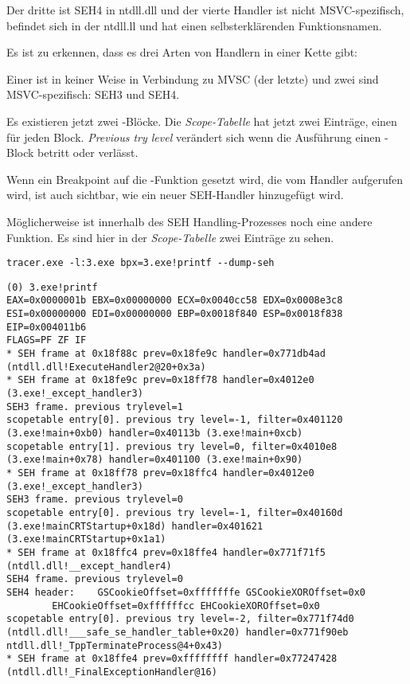 Der dritte ist SEH4 in ntdll.dll und der vierte Handler ist nicht MSVC-spezifisch,
befindet sich in der ntdll.ll und hat einen selbsterklärenden Funktionsnamen.

Es ist zu erkennen, dass es drei Arten von Handlern in einer Kette gibt:

Einer ist in keiner Weise in Verbindung zu MVSC (der letzte) und zwei sind MSVC-spezifisch:
SEH3 und SEH4.




Es existieren jetzt zwei -Blöcke.
Die \emph{Scope-Tabelle} hat jetzt zwei Einträge, einen für jeden Block.
\emph{Previous try level} verändert sich wenn die Ausführung einen -Block
betritt oder verlässt.



Wenn ein Breakpoint auf die \printf{}-Funktion gesetzt wird, die vom Handler
aufgerufen wird, ist auch sichtbar, wie ein neuer SEH-Handler hinzugefügt wird.

Möglicherweise ist innerhalb des SEH Handling-Prozesses noch eine andere Funktion.
Es sind hier in der \emph{Scope-Tabelle} zwei Einträge zu sehen.

\begin{lstlisting}
tracer.exe -l:3.exe bpx=3.exe!printf --dump-seh
\end{lstlisting}

\begin{lstlisting}[caption=tracer.exe output]
(0) 3.exe!printf
EAX=0x0000001b EBX=0x00000000 ECX=0x0040cc58 EDX=0x0008e3c8
ESI=0x00000000 EDI=0x00000000 EBP=0x0018f840 ESP=0x0018f838
EIP=0x004011b6
FLAGS=PF ZF IF
* SEH frame at 0x18f88c prev=0x18fe9c handler=0x771db4ad (ntdll.dll!ExecuteHandler2@20+0x3a)
* SEH frame at 0x18fe9c prev=0x18ff78 handler=0x4012e0 (3.exe!_except_handler3)
SEH3 frame. previous trylevel=1
scopetable entry[0]. previous try level=-1, filter=0x401120 (3.exe!main+0xb0) handler=0x40113b (3.exe!main+0xcb)
scopetable entry[1]. previous try level=0, filter=0x4010e8 (3.exe!main+0x78) handler=0x401100 (3.exe!main+0x90)
* SEH frame at 0x18ff78 prev=0x18ffc4 handler=0x4012e0 (3.exe!_except_handler3)
SEH3 frame. previous trylevel=0
scopetable entry[0]. previous try level=-1, filter=0x40160d (3.exe!mainCRTStartup+0x18d) handler=0x401621 (3.exe!mainCRTStartup+0x1a1)
* SEH frame at 0x18ffc4 prev=0x18ffe4 handler=0x771f71f5 (ntdll.dll!__except_handler4)
SEH4 frame. previous trylevel=0
SEH4 header:	GSCookieOffset=0xfffffffe GSCookieXOROffset=0x0
		EHCookieOffset=0xffffffcc EHCookieXOROffset=0x0
scopetable entry[0]. previous try level=-2, filter=0x771f74d0 (ntdll.dll!___safe_se_handler_table+0x20) handler=0x771f90eb ntdll.dll!_TppTerminateProcess@4+0x43)
* SEH frame at 0x18ffe4 prev=0xffffffff handler=0x77247428 (ntdll.dll!_FinalExceptionHandler@16)
\end{lstlisting}

